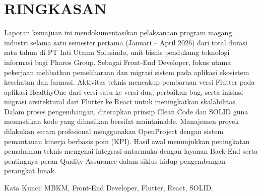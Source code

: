 
\chapter*{RINGKASAN}

Laporan kemajuan ini mendokumentasikan pelaksanaan program magang industri selama satu semester pertama (Januari – April 2026) dari total durasi satu tahun di PT Inti Utama Solusindo, unit bisnis pendukung teknologi informasi bagi Pharos Group. Sebagai Front-End Developer, fokus utama pekerjaan melibatkan pemeliharaan dan migrasi sistem pada aplikasi ekosistem kesehatan dan farmasi. Aktivitas teknis mencakup pembaruan versi Flutter pada aplikasi HealthyOne dari versi satu ke versi dua, perbaikan bug, serta inisiasi migrasi arsitektural dari Flutter ke React untuk meningkatkan skalabilitas. Dalam proses pengembangan, diterapkan prinsip Clean Code dan SOLID guna memastikan kode yang dihasilkan bersifat maintainable. Manajemen proyek dilakukan secara profesional menggunakan OpenProject dengan sistem pemantauan kinerja berbasis poin (KPI). Hasil awal menunjukkan peningkatan pemahaman teknis mengenai integrasi antarmuka dengan layanan Back-End serta pentingnya peran Quality Assurance dalam siklus hidup pengembangan perangkat lunak.

Kata Kunci: MBKM, Front-End Developer, Flutter, React, SOLID.